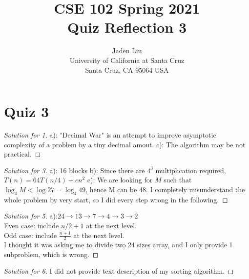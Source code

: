 \documentclass[12pt]{article}
\begin{document}
\title{ CSE 102 Spring 2021\\
	Quiz Reflection 3}

\author{Jaden Liu \\ 
University of California at Santa Cruz\\
Santa Cruz, CA 95064 USA }

\maketitle


\section{Quiz 3} 

\begin{proof}[Solution for 1]
	a): "Decimal War" is an attempt to improve asymptotic complexity of a problem by a tiny decimal amout.
	c): The algorithm may be not practical.
\end{proof}
\begin{proof}[Solution for 3]
	a): 16 blocks
	b): Since there are $4^3$ multiplication required, $T(n)=64T(n/4)+cn^2$
	c): We are looking for $M$ such that $\log_4M<\log27=\log_4{49}$, hence M can be 48.
	I completely misunderstand the whole problem by very start, so I did every step wrong in the following.
\end{proof}
\begin{proof}[Solution for 5]
	a):$24\rightarrow13\rightarrow7\rightarrow4\rightarrow3\rightarrow2$\\
	Even case: include $n/2+1$ at the next level.\\
	Odd case: include $\frac{n+1}{2}$ at the next level.\\
	I thought it was asking me to divide two 24 sizes array, and I only provide 1 subproblem, which is wrong.
\end{proof}
\begin{proof}[Solution for 6]
	I did not provide text description of my sorting algorithm.
\end{proof}
\bigskip
\end{document}
